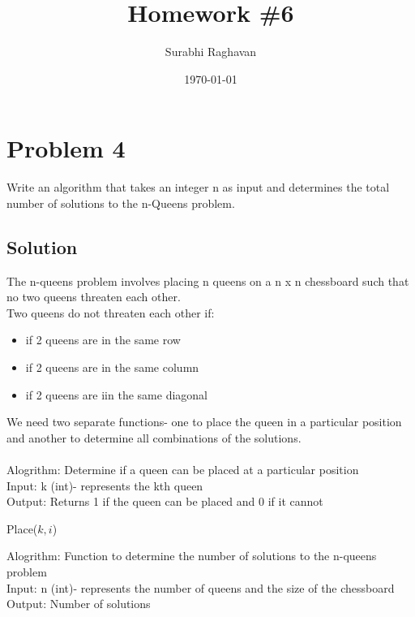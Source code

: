 \documentclass[12pt]{article}
\newcommand{\yourname}{Surabhi Raghavan}  %
\begin{document}
\title{Homework \#6}
\author{\yourname}
\date{\today}

\maketitle

\section*{Problem 4}
Write an algorithm that takes an integer n as input and determines the total
number of solutions to the n-Queens problem.
\subsection*{Solution}
The n-queens problem  involves placing n queens on a n x n chessboard such that no two queens threaten each other.
\\
Two queens do not threaten each other if:
\begin{itemize}
\item if 2 queens are in the same row
\item if 2 queens are in the same column 
\item if 2 queens are iin the same diagonal 
\end{itemize}
We need two separate functions- one to place the queen in a particular position and another to determine all combinations of the solutions.\\
\\
Alogrithm: Determine if a queen can  be placed at a particular position \\
Input: k (int)- represents the kth queen \\
Output: Returns 1 if the queen can be placed and 0 if it cannot\\

\begin{algorithm}
    \caption{Place($k, i$)}
    \begin{algorithmic}[1]
                \State {}
            \EndIf
        \EndFor
        \State {}
    \end{algorithmic}
    \end{algorithm}
    

Alogrithm: Function to determine the number of solutions to the n-queens problem\\
Input: n (int)- represents the number of queens and the size of the chessboard \\
Output: Number of solutions\\
\end{document}
